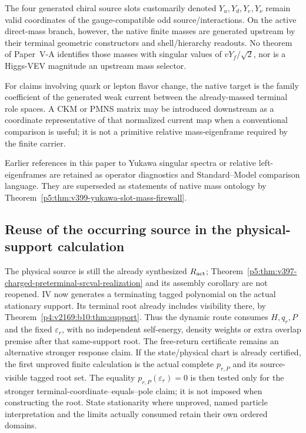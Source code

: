 \documentclass[12pt,a4paper]{article}
\begin{document}
\begin{theorem}
\label{p5:thm:v399-yukawa-slot-mass-firewall}
The four generated chiral source slots customarily denoted
$Y_u,Y_d,Y_e,Y_\nu$ remain valid coordinates of the gauge-compatible odd
source/interactions.  On the active direct-mass branch, however, the native
finite masses are generated upstream by their terminal geometric constructors
and shell/hierarchy readouts.  No theorem of Paper~V-A identifies those masses
with singular values of $vY_f/\sqrt2$, nor is a Higgs-VEV magnitude an upstream
mass selector.
\end{theorem}

\begin{corollary}
\label{p5:cor:v399-current-incidence-flavor-target}
For claims involving quark or lepton flavor change, the native target is the
family coefficient of the generated weak current between the already-massed
terminal role spaces.  A CKM or PMNS matrix may be introduced downstream as a
coordinate representative of that normalized current map when a conventional
comparison is useful; it is not a primitive relative mass-eigenframe required
by the finite carrier.
\end{corollary}

\begin{remark}
Earlier references in this paper to Yukawa singular spectra or relative
left-eigenframes are retained as operator diagnostics and Standard--Model
comparison language.  They are superseded as statements of native mass
ontology by Theorem~\ref{p5:thm:v399-yukawa-slot-mass-firewall}.
\end{remark}

\subsection{Reuse of the occurring source in the physical-support calculation}
\label{p5:sec:v2169-charged-support-application}

The physical source is still the already synthesized $R_{\rm act}$;
Theorem~\ref{p5:thm:v397-charged-preterminal-srcval-realization} and its
assembly corollary are not reopened. IV now generates a terminating tagged
polynomial on the actual stationary support. Its terminal root already
includes visibility there, by
Theorem~\ref{p4:v2169:b10:thm:support}. Thus the dynamic route consumes
$H,q_r,P$ and the fixed $\varepsilon_r$, with no independent self-energy,
density weights or extra overlap premise after that same-support root.
The free-return certificate remains an alternative stronger response claim.
If the state/physical chart is already certified, the first unproved finite
calculation is the actual complete $p_{r,P}$ and its source-visible tagged
root set.  The equality $p_{r,P}(\varepsilon_r)=0$ is then tested only for
the stronger terminal-coordinate--equals--pole claim; it is not imposed when
constructing the root.  State stationarity where unproved, named particle
interpretation and the limits actually consumed retain their own ordered
domains.
\end{document}
